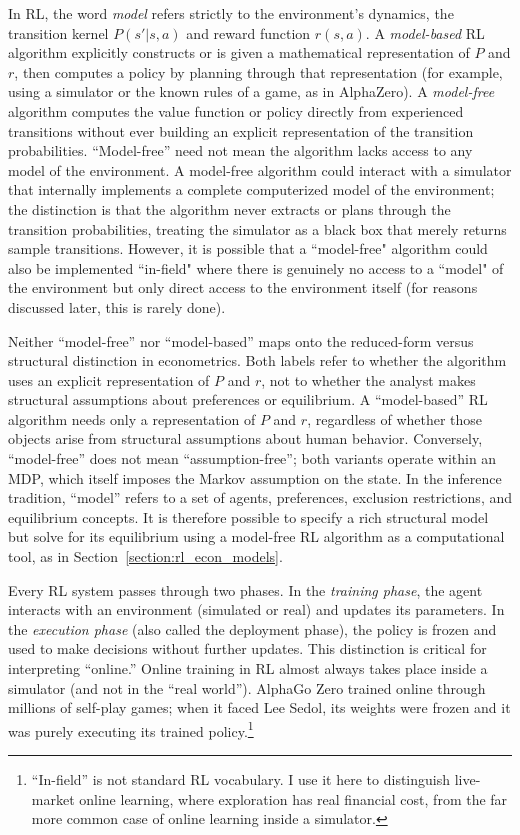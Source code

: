 In RL, the word \textit{model} refers strictly to the environment's dynamics, the transition kernel $P(s'|s,a)$ and reward function $r(s,a)$. A \textit{model-based} RL algorithm explicitly constructs or is given a mathematical representation of $P$ and $r$, then computes a policy by planning through that representation (for example, using a simulator or the known rules of a game, as in AlphaZero). A \textit{model-free} algorithm computes the value function or policy directly from experienced transitions without ever building an explicit representation of the transition probabilities. ``Model-free'' need not mean the algorithm lacks access to any model of the environment. A model-free algorithm could interact with a simulator that internally implements a complete computerized model of the environment; the distinction is that the algorithm never extracts or plans through the transition probabilities, treating the simulator as a black box that merely returns sample transitions. However, it is possible that a ``model-free" algorithm could also be implemented ``in-field" where there is genuinely no access to a ``model" of the environment but only direct access to the environment itself (for reasons discussed later, this is rarely done).

Neither ``model-free'' nor ``model-based'' maps onto the reduced-form versus structural distinction in econometrics. Both labels refer to whether the algorithm uses an explicit representation of $P$ and $r$, not to whether the analyst makes structural assumptions about preferences or equilibrium. A ``model-based'' RL algorithm needs only a representation of $P$ and $r$, regardless of whether those objects arise from structural assumptions about human behavior. Conversely, ``model-free'' does not mean ``assumption-free''; both variants operate within an MDP, which itself imposes the Markov assumption on the state. In the inference tradition, ``model'' refers to a set of agents, preferences, exclusion restrictions, and equilibrium concepts. It is therefore possible to specify a rich structural model but solve for its equilibrium using a model-free RL algorithm as a computational tool, as in Section~\ref{section:rl_econ_models}.

Every RL system passes through two phases. In the \textit{training phase}, the agent interacts with an environment (simulated or real) and updates its parameters. In the \textit{execution phase} (also called the deployment phase), the policy is frozen and used to make decisions without further updates. This distinction is critical for interpreting ``online.'' Online training in RL almost always takes place inside a simulator (and not in the ``real world''). AlphaGo Zero trained online through millions of self-play games; when it faced Lee Sedol, its weights were frozen and it was purely executing its trained policy.\footnote{``In-field'' is not standard RL vocabulary. I use it here to distinguish live-market online learning, where exploration has real financial cost, from the far more common case of online learning inside a simulator.}

